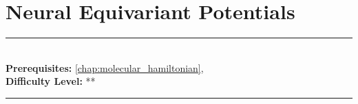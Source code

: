 \documentclass[book.tex]{subfiles}
\begin{document}
\chapter{Neural Equivariant Potentials}
\label{chap:neural_equivariant_potentials}
\noindent\rule{11cm}{0.4pt} \\
\textbf{Prerequisites:}  \autoref{chap:molecular_hamiltonian},   \\
\textbf{Difficulty Level:} ** \\
\noindent\rule{11cm}{0.4pt}
\vspace{5mm}

\end{document}
